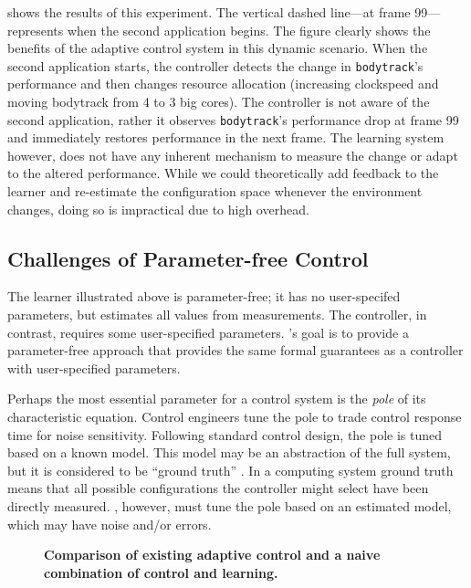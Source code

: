  shows the results of this experiment.  The
vertical dashed line---at frame 99---represents when the second
application begins.  The figure clearly shows the benefits of the
adaptive control system in this dynamic scenario.  When the second
application starts, the controller detects the change in
\texttt{bodytrack}'s performance and then changes resource allocation
(increasing clockspeed and moving bodytrack from 4 to 3 big cores).
The controller is not aware of the second application, rather it
observes \texttt{bodytrack}'s performance drop at frame 99 and
immediately restores performance in the next frame. The learning
system however, does not have any inherent mechanism to measure the
change or adapt to the altered performance.  While we could
theoretically add feedback to the learner and re-estimate the
configuration space whenever the environment changes, doing so is
impractical due to high overhead\cite{pargon,LEO}.


\subsection{Challenges of Parameter-free Control}
The learner illustrated above is parameter-free; \ie{} it has no
user-specifed parameters, but estimates all values from measurements.
The controller, in contrast, requires some user-specified parameters.
\SYSTEM{}'s goal is to provide a parameter-free approach that provides
the same formal guarantees as a controller with user-specified
parameters.

Perhaps the most essential parameter for a control system is the
\emph{pole} of its characteristic equation.  Control engineers tune
the pole to trade control response time for noise sensitivity.
Following standard control design, the pole is tuned based on a known
model.  This model may be an abstraction of the full system, but it is
considered to be ``ground truth'' \cite{Hellerstein2004a}. In a
computing system ground truth means that all possible configurations
the controller might select have been directly measured.  \SYSTEM{},
however, must tune the pole based on an estimated model, which may
have noise and/or errors.


\begin{figure}
\centering

\caption{\small \bf Comparison of existing adaptive control and a
  naive combination of control and learning.}
\label{fig:not-simple}
\end{figure}

